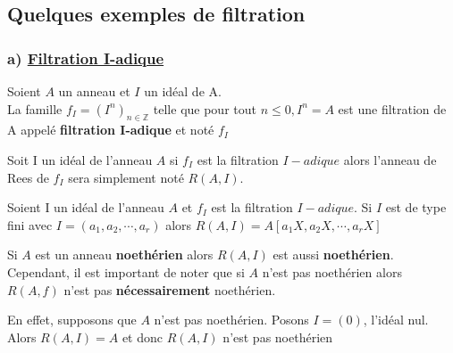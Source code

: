 \subsection{Quelques exemples de filtration}
\subsubsection{a) \underline{Filtration I-adique}}
\begin{madefinition}
	Soient $A$ un anneau et $I$ un idéal de A.\\
	La famille $f_I = (I^n)_{n\in \mathbb{Z}}$ telle que pour tout $n \leqslant 0, I^n = A$ est une filtration de A appelé \textbf{filtration I-adique} et noté $f_I$
\end{madefinition}
Soit I un idéal de l'anneau $A$ si $f_I$ est la filtration $I-adique$ alors l'anneau de Rees de $f_I$ sera simplement noté $R(A,I)$.
\begin{maproposition}
	Soient I un idéal de l'anneau $A$ et $f_I$ est la filtration $I-adique$.
	Si $I$ est de type fini avec $I = (a_1, a_2, \cdots, a_r)$ alors $R(A,I) = A[a_1X,a_2X, \cdots, a_rX] $
\end{maproposition}
\begin{maconsequence}
	Si $A$ est un anneau \textbf{noethérien} alors $R(A,I)$ est aussi \textbf{noethérien}. \\
	Cependant, il est important de noter que si $A$ n'est pas noethérien alors $R(A,f)$ n'est pas \textbf{nécessairement} noethérien.
\end{maconsequence}
\begin{monexemple}
	En effet, supposons que $A$ n'est pas noethérien.
	Posons $I = (0)$, l'idéal nul. Alors $R(A,I) = A$ et donc $R(A,I)$ n'est pas noethérien
\end{monexemple}

